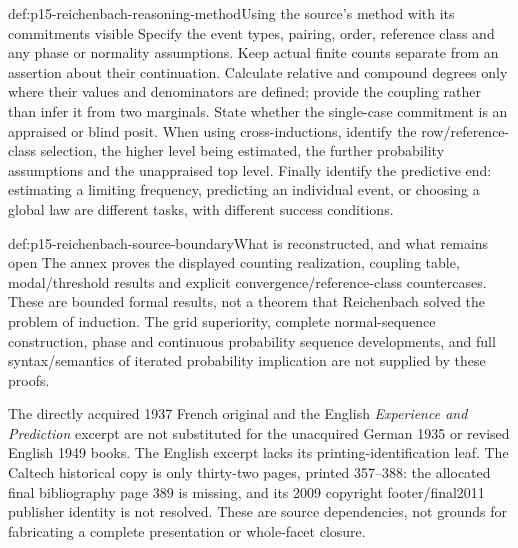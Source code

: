 \begin{hbmethod}{def:p15-reichenbach-reasoning-method}{Using the source's method with its commitments visible}
Specify the event types, pairing, order, reference class and any phase
or normality assumptions. Keep actual finite counts separate from an
assertion about their continuation. Calculate relative and compound
degrees only where their values and denominators are defined; provide
the coupling rather than infer it from two marginals. State whether
the single-case commitment is an appraised or blind posit. When using
cross-inductions, identify the row/reference-class selection, the higher
level being estimated, the further probability assumptions and the
unappraised top level. Finally identify the predictive end: estimating
a limiting frequency, predicting an individual event, or choosing a
global law are different tasks, with different success conditions.
\end{hbmethod}

\begin{proofboundary}{def:p15-reichenbach-source-boundary}{What is reconstructed, and what remains open}
The annex proves the displayed counting realization, coupling table,
modal/threshold results and explicit convergence/reference-class
countercases. These are bounded formal results, not a theorem that
Reichenbach solved the problem of induction. The grid superiority,
complete normal-sequence construction, phase and continuous probability
sequence developments, and full syntax/semantics of iterated probability
implication are not supplied by these proofs.

The directly acquired 1937 French original and the English
\emph{Experience and Prediction} excerpt are not substituted for the
unacquired German 1935 or revised English 1949 books. The English excerpt
lacks its printing-identification leaf. The Caltech historical copy is
only thirty-two pages, printed 357--388: the allocated final bibliography
page 389 is missing, and its 2009 copyright footer/final2011 publisher
identity is not resolved. These are source dependencies, not grounds
for fabricating a complete presentation or whole-facet closure.
\end{proofboundary}
